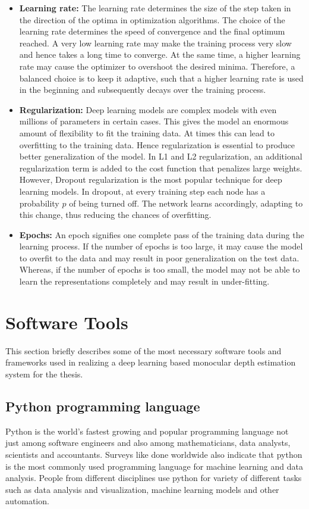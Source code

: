\begin{itemize}
	\item \textbf{Learning rate:} The learning rate determines the size of the step taken in the direction of the optima in optimization algorithms. The choice of the learning rate determines the speed of convergence and the final optimum reached. A very low learning rate may make the training process very slow and hence takes a long time to converge. At the same time, a higher learning rate may cause the optimizer to overshoot the desired minima. Therefore, a balanced choice is to keep it adaptive, such that a higher learning rate is used in the beginning and subsequently decays over the training process.
	
	\item \textbf{Regularization:} Deep learning models are complex models with even millions of parameters in certain cases. This gives the model an enormous amount of flexibility to fit the training data. At times this can lead to overfitting to the training data. Hence regularization is essential to produce better generalization of the model. In L1 and L2 regularization, an additional regularization term is added to the cost function that penalizes large weights. However, Dropout regularization is the most popular technique for deep learning models. In dropout, at every training step each node has a probability $p$ of being turned off. The network learns accordingly, adapting to this change, thus reducing the chances of overfitting.
	
	\item \textbf{Epochs:} An epoch signifies one complete pass of the training data during the learning process. If the number of epochs is too large, it may cause the model to overfit to the data and may result in poor generalization on the test data. Whereas, if the number of epochs is too small, the model may not be able to learn the representations completely and may result in under-fitting. 
\end{itemize}


\section{Software Tools}
\label{sec:fundamentals:sw-tools}

This section briefly describes some of the most necessary software tools and frameworks used in realizing a deep learning based monocular depth estimation system for the thesis. 

\subsection{Python programming language}
Python is the world's fastest growing and popular programming language not just among software engineers and also among mathematicians, data analysts, scientists and accountants. Surveys like \cite{businessoverbroadway.com} \cite{rowe_2018} done worldwide also indicate that python is the most commonly used programming language for machine learning and data analysis. People from different disciplines use python for variety of different tasks such as data analysis and visualization, machine learning models and other automation.

